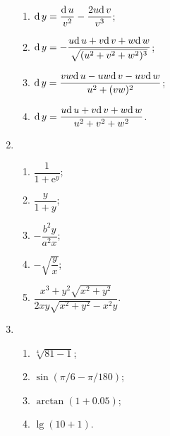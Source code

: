 \begin{enumerate}
\begin{enumerate}[(1)]
            \item %
                $\mathrm{d}\, y = \dfrac{\mathrm{d}\, u}{v^2} - \dfrac{2u\mathrm{d}\, v}{v^3}$;
            \item %
                $\mathrm{d}\, y = -\dfrac{u\mathrm{d}\, u + v\mathrm{d}\, v + w\mathrm{d}\, w}{\sqrt{(u^2 + v^2 + w^2)^3}}$;
            \item %
                $\mathrm{d}\, y = \dfrac{vw\mathrm{d}\, u - uw\mathrm{d}\, v - uv\mathrm{d}\, w}{u^2 + (vw)^2}$;
            \item %
                $\mathrm{d}\, y = \dfrac{u\mathrm{d}\, u + v\mathrm{d}\, v + w\mathrm{d}\, w}{u^2 + v^2 + w^2}$.
        \end{enumerate}
    \item %
        \begin{enumerate}[(1)]
            \item %
                $\dfrac{1}{1 + \mathrm{e}^y}$;
            \item %
                $\dfrac{y}{1 + y}$;
            \item %
                $-\dfrac{b^2y}{a^2x}$;
            \item %
                $-\sqrt{\dfrac yx}$;
            \item %
                $\dfrac{x^3 + y^2\sqrt{x^2+y^2}}{2xy\sqrt{x^2+y^2} - x^2y}$.
        \end{enumerate}
    \item %
        \begin{enumerate}[(1)]
            \item %
                $\sqrt[4]{81 - 1}$;
            \item %
                $\sin(\pi/6 - \pi/180)$;
            \item %
                $\arctan(1 + 0.05)$;
            \item %
                $\lg(10 + 1)$.
        \end{enumerate}
\end{enumerate}
% 